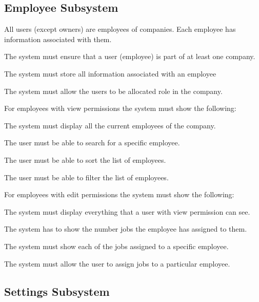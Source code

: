 \documentclass{article}
\begin{document}
	\subsection*{Employee Subsystem}	
	All users (except owners) are employees of companies. Each employee has information associated with them.
	\begin{list}{R.}{}
		\item The system must ensure that a user (employee) is part of at least one company.
		\item The system must store all information associated with an employee 
		\item The system must allow the users to be allocated role in the company.
		\item For employees with view permissions the system must show the following: 
		\begin{list}{R.}{}
			\item The system must display all the current employees of the company.
			\item The user must be able to search for a specific employee.
			\item The user must be able to sort the list of employees.
			\item The user must be able to filter the list of employees.
		\end{list}
		\item For employees with edit permissions the system must show the following: 
		\begin{list}{R.}{}
			\item The system must display everything that a user with view permission can see.
			\item The system has to show the number jobs the employee has assigned to them.
			\item The system must show each of the jobs assigned to a specific employee.
			\item The system must allow the user to assign jobs to a particular employee.
		\end{list}			
	\end{list}
	
	\subsection*{Settings Subsystem}	
\end{document}
